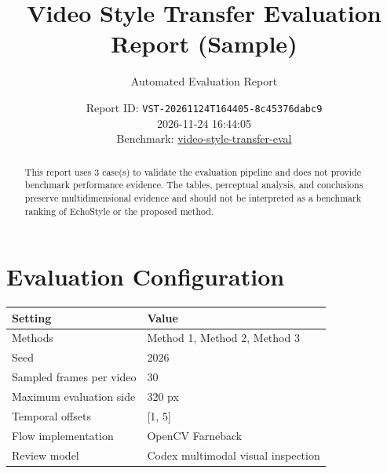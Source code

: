 \documentclass[10pt]{article}
\begin{document}
\title{Video Style Transfer Evaluation Report (Sample)}
\author{Automated Evaluation Report}
\date{Report ID: \texttt{VST-20261124T164405-8c45376dabc9} \\ 2026-11-24 16:44:05 \\ Benchmark: \href{https://github.com/0x0addc001/video-style-transfer-eval}{video-style-transfer-eval}}
\maketitle
\begin{abstract}
This report uses 3 case(s) to validate the evaluation pipeline and does not provide benchmark performance evidence. The tables, perceptual analysis, and conclusions preserve multidimensional evidence and should not be interpreted as a benchmark ranking of EchoStyle or the proposed method.
\end{abstract}
\section*{Evaluation Configuration}
\begin{tabular}{@{}ll@{}}
\toprule
Setting & Value \\
\midrule
Methods & Method 1, Method 2, Method 3 \\
Seed & 2026 \\
Sampled frames per video & 30 \\
Maximum evaluation side & 320 px \\
Temporal offsets & [1, 5] \\
Flow implementation & OpenCV Farneback \\
Review model & Codex multimodal visual inspection \\
\bottomrule
\end{tabular}
\end{document}
